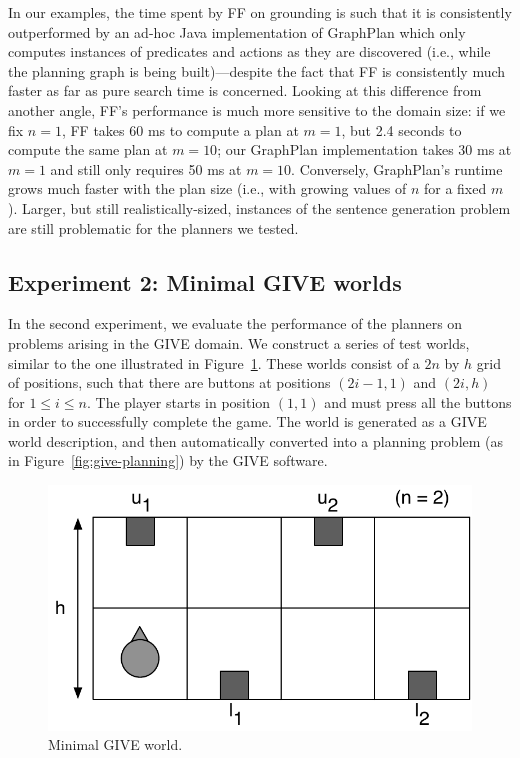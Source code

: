 In our examples, the time spent by FF on grounding is such that it is
consistently outperformed by an ad-hoc Java implementation of GraphPlan
which only computes instances of predicates and actions as they are
discovered (i.e., while the planning graph is being built)---despite the
fact that FF is consistently much faster as far as pure search time is
concerned.  Looking at this difference from another angle, FF's performance
is much more sensitive to the domain size: if we fix $n=1$, FF takes 60 ms
to compute a plan at $m=1$, but 2.4 seconds to compute the same plan at
$m=10$; our GraphPlan implementation takes 30 ms at $m=1$ and still only
requires 50 ms at $m=10$.  Conversely, GraphPlan's runtime grows much
faster with the plan size (i.e., with growing values of $n$ for a fixed
$m$).  Larger, but still realistically-sized, instances of the sentence
generation problem are still problematic for the planners we tested.


\subsection{Experiment 2: Minimal GIVE worlds}
\label{sec:exper-2:-minim}

In the second experiment, we evaluate the performance of the planners
on problems arising in the GIVE domain. We construct a series of test
worlds, similar to the one illustrated in
Figure~\ref{fig:give-minimal}. These worlds consist of a $2n$ by $h$
grid of positions, such that there are buttons at positions $(2i-1,1)$
and $(2i,h)$ for $1 \leq i \leq n$. The player starts in position $(1,1)$
and must press all the buttons in order to successfully complete the game.
The world is generated as a GIVE world description, and then automatically
converted into a planning problem (as in Figure~\ref{fig:give-planning}) by
the GIVE software.

\begin{figure}
  \centering
  \includegraphics[width=0.8\columnwidth]{pic-buttons}
  \caption{Minimal GIVE world.}
  \label{fig:give-minimal}
\end{figure}

